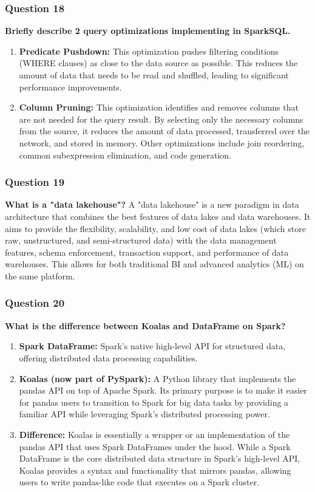 \documentclass{article}
\begin{document}
\subsubsection*{Question 18}
\textbf{Briefly describe 2 query optimizations implementing in SparkSQL.}
    \begin{enumerate}[label=\alph*)]
        \item \textbf{Predicate Pushdown:} This optimization pushes filtering conditions (WHERE clauses) as close to the data source as possible. This reduces the amount of data that needs to be read and shuffled, leading to significant performance improvements.
        \item \textbf{Column Pruning:} This optimization identifies and removes columns that are not needed for the query result. By selecting only the necessary columns from the source, it reduces the amount of data processed, transferred over the network, and stored in memory.
        Other optimizations include join reordering, common subexpression elimination, and code generation.
    \end{enumerate}

\subsubsection*{Question 19}
\textbf{What is a "data lakehouse"?}
    A "data lakehouse" is a new paradigm in data architecture that combines the best features of data lakes and data warehouses. It aims to provide the flexibility, scalability, and low cost of data lakes (which store raw, unstructured, and semi-structured data) with the data management features, schema enforcement, transaction support, and performance of data warehouses. This allows for both traditional BI and advanced analytics (ML) on the same platform.

\subsubsection*{Question 20}
\textbf{What is the difference between Koalas and DataFrame on Spark?}
    \begin{enumerate}[label=\alph*)]
        \item \textbf{Spark DataFrame:} Spark's native high-level API for structured data, offering distributed data processing capabilities.
        \item \textbf{Koalas (now part of PySpark):} A Python library that implements the pandas API on top of Apache Spark. Its primary purpose is to make it easier for pandas users to transition to Spark for big data tasks by providing a familiar API while leveraging Spark's distributed processing power.
        \item \textbf{Difference:} Koalas is essentially a wrapper or an implementation of the pandas API that uses Spark DataFrames under the hood. While a Spark DataFrame is the core distributed data structure in Spark's high-level API, Koalas provides a syntax and functionality that mirrors pandas, allowing users to write pandas-like code that executes on a Spark cluster.
    \end{enumerate}
\end{document}
